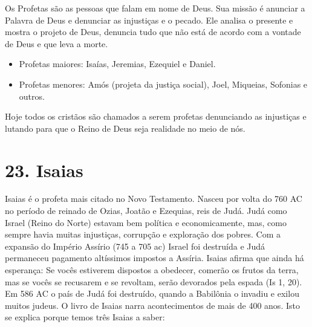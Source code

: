 \documentclass[
]{book}
\begin{document}
Os Profetas são as pessoas que falam em nome de Deus. Sua missão é anunciar a Palavra de Deus e denunciar as injustiças e o pecado. Ele analisa o presente e mostra o projeto de Deus, denuncia tudo que não está de acordo com a vontade de Deus e que leva a morte.

\begin{itemize}
\item
  Profetas maiores: Isaías, Jeremias, Ezequiel e Daniel.
\item
  Profetas menores: Amós (projeta da justiça social), Joel, Miqueias, Sofonias e outros.
\end{itemize}

Hoje todos os cristãos são chamados a serem profetas denunciando as injustiças e lutando para que o Reino de Deus seja realidade no meio de nós.

\hypertarget{isaias}{%
\section*{23. Isaias}\label{isaias}}

Isaias é o profeta mais citado no Novo Testamento. Nasceu por volta do 760 AC no período de reinado de Ozias, Joatão e Ezequias, reis de Judá. Judá como Israel (Reino do Norte) estavam bem política e economicamente, mas, como sempre havia muitas injustiças, corrupção e exploração dos pobres. Com a expansão do Império Assírio (745 a 705 ac) Israel foi destruída e Judá permaneceu pagamento altíssimos impostos a Assíria. Isaias afirma que ainda há esperança: Se vocês estiverem dispostos a obedecer, comerão os frutos da terra, mas se vocês se recusarem e se revoltam, serão devorados pela espada (Is 1, 20). Em 586 AC o país de Judá foi destruído, quando a Babilônia o invadiu e exilou muitos judeus. O livro de Isaias narra acontecimentos de mais de 400 anos. Isto se explica porque temos três Isaias a saber:
\end{document}
